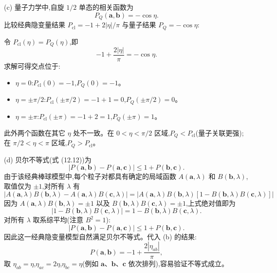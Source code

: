 \begin{solution}
(c) 量子力学中,自旋 $1/2$ 单态的相关函数为
\[
\boxed{P_Q(\mathbf a,\mathbf b) = -\cos\eta.}
\]
比较经典隐变量结果 $P_{\text{cl}} = -1+2|\eta|/\pi$ 与量子结果 $P_Q = -\cos\eta$:

令 $P_{\text{cl}}(\eta)=P_Q(\eta)$,即
\[
-1+\frac{2|\eta|}{\pi} = -\cos\eta.
\]
求解可得交点位于:
\begin{itemize}
\item $\eta=0$:$P_{\text{cl}}(0) = -1$,$P_Q(0) = -1$。
\item $\eta=\pm\pi/2$:$P_{\text{cl}}(\pm\pi/2) = -1+1 = 0$,$P_Q(\pm\pi/2) = 0$。
\item $\eta=\pm\pi$:$P_{\text{cl}}(\pm\pi) = -1+2 = 1$,$P_Q(\pm\pi) = 1$。
\end{itemize}
此外两个函数在其它 $\eta$ 处不一致。在 $0<\eta<\pi/2$ 区域,$P_Q < P_{\text{cl}}$(量子关联更强);在 $\pi/2<\eta<\pi$ 区域,$P_Q > P_{\text{cl}}$。

(d) 贝尔不等式(式 (12.12))为
\[
|P(\mathbf a,\mathbf b)-P(\mathbf a,\mathbf c)| \le 1+P(\mathbf b,\mathbf c).
\]
由于该经典棒球模型中,每个粒子对都具有确定的局域函数 $A(\mathbf a,\lambda)$ 和 $B(\mathbf b,\lambda)$,取值仅为 $\pm1$,对所有 $\lambda$ 有
\[
|A(\mathbf a,\lambda)B(\mathbf b,\lambda)-A(\mathbf a,\lambda)B(\mathbf c,\lambda)| = |A(\mathbf a,\lambda)B(\mathbf b,\lambda)[1-B(\mathbf b,\lambda)B(\mathbf c,\lambda)]|
\]
因为 $A(\mathbf a,\lambda)B(\mathbf b,\lambda)=\pm1$ 以及 $B(\mathbf b,\lambda)B(\mathbf c,\lambda)=\pm1$,上式绝对值即为
\[
|1-B(\mathbf b,\lambda)B(\mathbf c,\lambda)| = 1-B(\mathbf b,\lambda)B(\mathbf c,\lambda).
\]
对所有 $\lambda$ 取系综平均(注意 $B^2=1$):
\[
|P(\mathbf a,\mathbf b)-P(\mathbf a,\mathbf c)| \le 1+P(\mathbf b,\mathbf c).
\]
因此这一经典隐变量模型自然满足贝尔不等式。代入 (b) 的结果:
\[
P(\mathbf a,\mathbf b) = -1+\frac{2|\eta_{ab}|}{\pi},
\]
取 $\eta_{ab}=\eta$,$\eta_{ac}=2\eta$,$\eta_{bc}=\eta$(例如 $\mathbf a$、$\mathbf b$、$\mathbf c$ 依次排列),容易验证不等式成立。
\end{solution}

